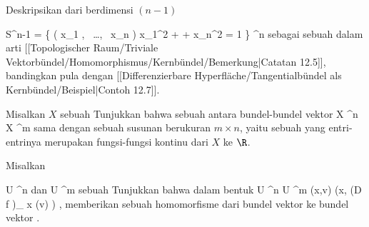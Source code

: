 {}
{

Deskripsikan
dari
berdimensi $(n-1 )$

\mavergleichskettedisp
{\vergleichskette
{ S^{n-1}
}
{ =} { \left\{  \left(  x_1   , \,   \ldots  , \,   x_n          \right)   \mid   x_1^2 + \cdots + x_n^2 = 1         \right\}
}
{ \subset} { \R^n
}
{ } {
}
{ } {
}
}
{}{}{}
sebagai sebuah
dalam arti
[[Topologischer Raum/Triviale Vektorbündel/Homomorphismus/Kernbündel/Bemerkung|Catatan 12.5]],
bandingkan pula dengan
[[Differenzierbare Hyperfläche/Tangentialbündel als Kernbündel/Beispiel|Contoh 12.7]].

}
{} {}

{}
{

Misalkan $X$ sebuah
Tunjukkan bahwa sebuah
antara bundel-bundel vektor
 {} {}
\maabbdisp {\varphi} {X \times \R^n } { X \times \R^m
} {}
sama dengan sebuah susunan berukuran
$m \times n$, yaitu sebuah
yang entri-entrinya merupakan fungsi-fungsi kontinu dari $X$ ke $\R$.

}
{} {}

{}
{

Misalkan

\mavergleichskette
{\vergleichskette
{U
}
{ \subseteq }{ \R^n
}
{  }{
}
{    }{
}
{   }{
}
}
{}{}{}
dan
 { U } { \R^m
} {}
sebuah
Tunjukkan bahwa
dalam bentuk
\maabbeledisp {} { U \times \R^n } { U \times \R^m
} { (x,v)} { (x, \left(D f \right)_{ x} (v) )
} {,}
memberikan sebuah homomorfisme dari bundel vektor
 ke bundel vektor
.

}
{} {}

